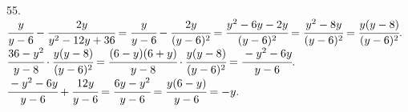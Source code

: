 55. $\cfrac{y}{y-6}-\cfrac{2y}{y^2-12y+36}=\cfrac{y}{y-6}-\cfrac{2y}{(y-6)^2}=\cfrac{y^2-6y-2y}{(y-6)^2}=\cfrac{y^2-8y}{(y-6)^2}=\cfrac{y(y-8)}{(y-6)^2}.$\\
$\cfrac{36-y^2}{y-8}\cdot\cfrac{y(y-8)}{(y-6)^2}=\cfrac{(6-y)(6+y)}{y-8}\cdot\cfrac{y(y-8)}{(y-6)^2}=\cfrac{-y^2-6y}{y-6}.$\\
$\cfrac{-y^2-6y}{y-6}+\cfrac{12y}{y-6}=\cfrac{6y-y^2}{y-6}=\cfrac{y(6-y)}{y-6}=-y.$\\

